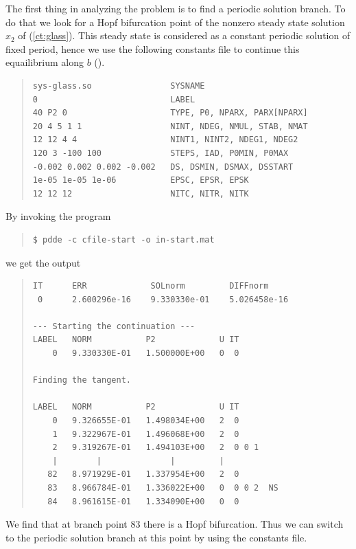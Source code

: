 \documentclass[10pt,a4paper]{ddedoc}
\begin{document}
The first thing in analyzing the problem is to find a periodic solution
branch. To do that we look for a Hopf bifurcation point of the nonzero steady state solution
$x_2$ of (\ref{ct:glass}). This steady state is considered as a constant periodic solution of
fixed period, hence we use the following constants file to continue this equailibrium along $b$ ().
{ \small \begin{quote} \begin{lstlisting}[basicstyle=\tt,frame=single]
sys-glass.so                SYSNAME
0                           LABEL
40 P2 0                     TYPE, P0, NPARX, PARX[NPARX]
20 4 5 1 1                  NINT, NDEG, NMUL, STAB, NMAT
12 12 4 4                   NINT1, NINT2, NDEG1, NDEG2
120 3 -100 100              STEPS, IAD, P0MIN, P0MAX
-0.002 0.002 0.002 -0.002   DS, DSMIN, DSMAX, DSSTART
1e-05 1e-05 1e-06           EPSC, EPSR, EPSK
12 12 12                    NITC, NITR, NITK
\end{lstlisting} \end{quote} } \noindent
By invoking the program
{ \small \begin{quote} \begin{lstlisting}[basicstyle=\tt,frame=single]
$ pdde -c cfile-start -o in-start.mat
\end{lstlisting} \end{quote} } \noindent
we get the output
{ \small \begin{quote} \begin{lstlisting}[basicstyle=\tt,frame=single]
IT      ERR             SOLnorm         DIFFnorm
 0      2.600296e-16    9.330330e-01    5.026458e-16

--- Starting the continuation ---
LABEL   NORM           P2             U IT
    0   9.330330E-01   1.500000E+00   0  0

Finding the tangent.

LABEL   NORM           P2             U IT
    0   9.326655E-01   1.498034E+00   2  0
    1   9.322967E-01   1.496068E+00   2  0
    2   9.319267E-01   1.494103E+00   2  0 0 1
    |        |              |         |
   82   8.971929E-01   1.337954E+00   2  0
   83   8.966784E-01   1.336022E+00   0  0 0 2  NS
   84   8.961615E-01   1.334090E+00   0  0
\end{lstlisting} \end{quote} } \noindent
We find that at branch point 83 there is a Hopf bifurcation. Thus we can switch to the periodic solution branch at this point
by using the constants file.
\end{document}
